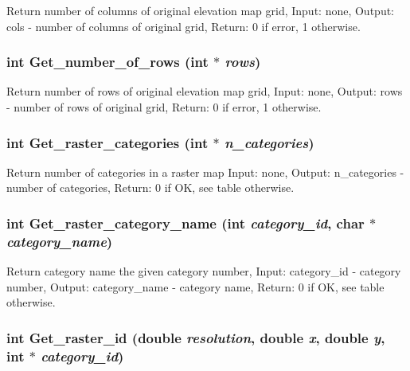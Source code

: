 Return number of columns of original elevation map grid, Input: none, Output: cols - number of columns of original grid, Return: 0 if error, 1 otherwise. 

\hypertarget{GisApi_8C_a65}{
\subsubsection[Get\_\-number\_\-of\_\-rows]{\setlength{\rightskip}{0pt plus 5cm}int Get\_\-number\_\-of\_\-rows (int $\ast$ {\em rows})}}
\label{GisApi_8C_a65}


Return number of rows of original elevation map grid, Input: none, Output: rows - number of rows of original grid, Return: 0 if error, 1 otherwise. 

\hypertarget{GisApi_8C_a43}{
\subsubsection[Get\_\-raster\_\-categories]{\setlength{\rightskip}{0pt plus 5cm}int Get\_\-raster\_\-categories (int $\ast$ {\em n\_\-categories})}}
\label{GisApi_8C_a43}


Return number of categories in a raster map Input: none, Output: n\_\-categories - number of categories, Return: 0 if OK, see table otherwise. 

\hypertarget{GisApi_8C_a44}{
\subsubsection[Get\_\-raster\_\-category\_\-name]{\setlength{\rightskip}{0pt plus 5cm}int Get\_\-raster\_\-category\_\-name (int {\em category\_\-id}, char $\ast$ {\em category\_\-name})}}
\label{GisApi_8C_a44}


Return category name the given category number, Input: category\_\-id - category number, Output: category\_\-name - category name, Return: 0 if OK, see table otherwise. 

\hypertarget{GisApi_8C_a69}{
\subsubsection[Get\_\-raster\_\-id]{\setlength{\rightskip}{0pt plus 5cm}int Get\_\-raster\_\-id (double {\em resolution}, double {\em x}, double {\em y}, int $\ast$ {\em category\_\-id})}}
\label{GisApi_8C_a69}



